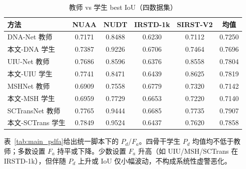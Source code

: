 \documentclass[lettersize,journal]{IEEEtran}
\begin{document}
\begin{table}[!t]
\renewcommand{\arraystretch}{1.12}
\caption{教师 vs 学生 best IoU（四数据集）}
\label{tab:main_iou}
\centering
\begin{tabular}{@{}lccccc@{}}
\toprule
方法 & NUAA & NUDT & IRSTD-1k & SIRST-V2 & 均值 \\
\midrule
DNA-Net 教师 & 0.7171 & 0.8488 & 0.6230 & 0.7112 & 0.7250 \\
本文-DNA 学生 & 0.7387 & 0.9226 & 0.6706 & 0.7464 & 0.7696 \\
\midrule
UIU-Net 教师 & 0.7686 & 0.8596 & 0.6376 & 0.8558 & 0.7804 \\
本文-UIU 学生 & 0.7741 & 0.8471 & 0.6439 & 0.8625 & 0.7819 \\
\midrule
MSHNet 教师 & 0.6909 & 0.7558 & 0.6779 & 0.7320 & 0.7142 \\
本文-MSH 学生 & 0.6959 & 0.7729 & 0.6653 & 0.7220 & 0.7140 \\
\midrule
SCTransNet 教师 & 0.7765 & 0.9444 & 0.6685 & 0.7735 & 0.7907 \\
本文-SCTrans 学生 & 0.7849 & 0.9524 & 0.6437 & 0.7620 & 0.7858 \\
\bottomrule
\end{tabular}
\end{table}

表~\ref{tab:main_pdfa}给出统一脚本下的 $P_d$/$F_a$。四骨干学生 $P_d$ 均值均不低于教师；多数设置 $F_a$ 持平或下降。少数设置 $F_a$ 升高（如 UIU/MSH/SCTrans 在 IRSTD-1k），但伴随 $P_d$ 上升或 IoU 仅小幅波动，不构成系统性虚警恶化。
\end{document}
